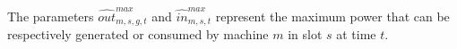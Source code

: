 \documentclass{article}
\newcommand{\cT}{{\mathcal T}}
\newcommand{\cP}{{\mathcal P}}
\newcommand{\cS}{{\mathcal S}}
\begin{document}
{\begin{comment}
		& M_{2,t} = M_{3,t} \cdot \hat{c}_{t}^{el,sold} \hspace{11cm} \forall t \in \cT \label{eq:M2}\\
		& M_{3,t} = \left( \sum_{m \in \cP^+} \sum_{s \in \cS} \hat{el}_{m,s,t}^{max, gen} \right) \cdot 1.5 \hspace{9cm} \forall t \in \cT \label{eq:M3}\\
		& M_{4,t} = \left( \hat{El}_t^{demand} + \sum_{m \in \cP^-} \sum_{s \in \cS} \hat{el}_{m,s,t}^{max, cons} \right) \cdot 1.5 \hspace{7cm} \forall t \in \cT \label{eq:M4}
		\end{align}
\end{comment}
The parameters $\hat{out}_{m,s,g,t}^{max}$ and $\hat{in}_{m,s,t}^{max}$ represent the maximum power that can be respectively generated or consumed by machine $m$ in slot $s$ at time $t$. 


}
\end{document}
